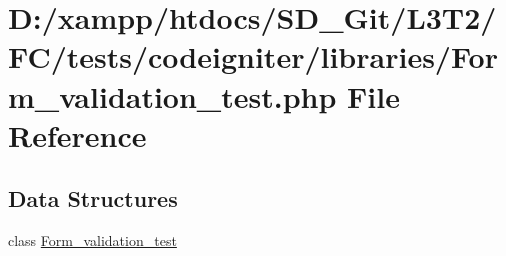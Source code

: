 \hypertarget{_form__validation__test_8php}{}\section{D\+:/xampp/htdocs/\+S\+D\+\_\+\+Git/\+L3\+T2/\+F\+C/tests/codeigniter/libraries/\+Form\+\_\+validation\+\_\+test.php File Reference}
\label{_form__validation__test_8php}
\subsection*{Data Structures}
\begin{DoxyCompactItemize}
\item 
class \hyperlink{class_form__validation__test}{Form\+\_\+validation\+\_\+test}
\end{DoxyCompactItemize}
